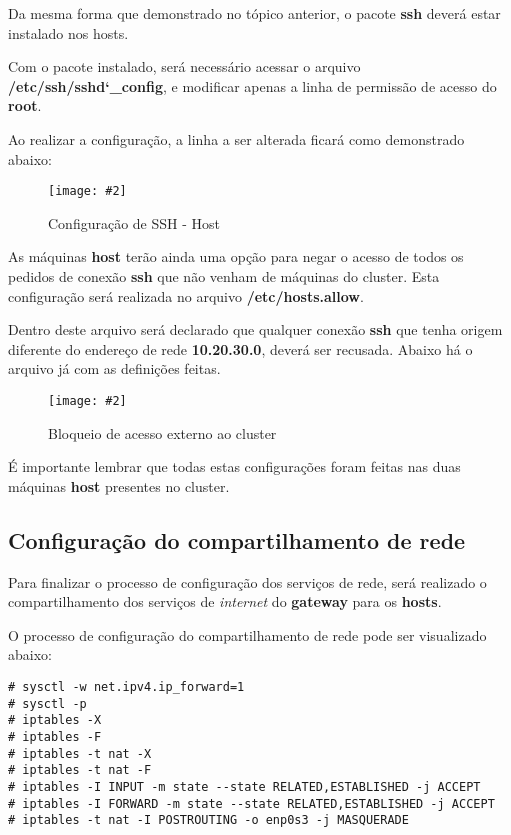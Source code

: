 \documentclass[
	12pt,				%
	openany,			%
	a4paper,			%
	chapter=TITLE,		%
	section=TITLE,		%
	english,
	brazil				%
]{abntex2}
\newcommand{\includeImage}[3] {

\begin{figure}[H]
 	 \centering
  		\texttt{[image: \#2]}
  	\caption{#3}
\end{figure}

}
\begin{document}
Da mesma forma que demonstrado no tópico anterior, o pacote \textbf{ssh} deverá estar instalado nos hosts.

Com o pacote instalado, será necessário acessar o arquivo \textbf{/etc/ssh/sshd\char`_config}, e modificar apenas a linha de permissão de acesso do \textbf{root}. 

Ao realizar a configuração, a linha a ser alterada ficará como demonstrado abaixo:
\includeImage{0.7}{imgs/4_configuracao_servicos_rede/1_host_1.png}{Configuração de SSH - Host}

As máquinas \textbf{host} terão ainda uma opção para negar o acesso de todos os pedidos de conexão \textbf{ssh} que não venham de máquinas do cluster. Esta configuração será realizada no arquivo \textbf{/etc/hosts.allow}.

Dentro deste arquivo será declarado que qualquer conexão \textbf{ssh} que tenha origem diferente do endereço de rede \textbf{10.20.30.0}, deverá ser recusada. Abaixo há o arquivo já com as definições feitas.

\includeImage{0.5}{imgs/4_configuracao_servicos_rede/1_host_2.png}{Bloqueio de acesso externo ao cluster}


É importante lembrar que todas estas configurações foram feitas nas duas máquinas \textbf{host} presentes no cluster.


\subsection{Configuração do compartilhamento de rede}

Para finalizar o processo de configuração dos serviços de rede, será realizado o compartilhamento dos serviços de \textit{internet} do \textbf{gateway} para os \textbf{hosts}.

O processo de configuração do compartilhamento de rede pode ser visualizado abaixo:

\begin{lstlisting}
# sysctl -w net.ipv4.ip_forward=1
# sysctl -p 
# iptables -X
# iptables -F
# iptables -t nat -X
# iptables -t nat -F 
# iptables -I INPUT -m state --state RELATED,ESTABLISHED -j ACCEPT
# iptables -I FORWARD -m state --state RELATED,ESTABLISHED -j ACCEPT 
# iptables -t nat -I POSTROUTING -o enp0s3 -j MASQUERADE
\end{lstlisting} 
\end{document}
